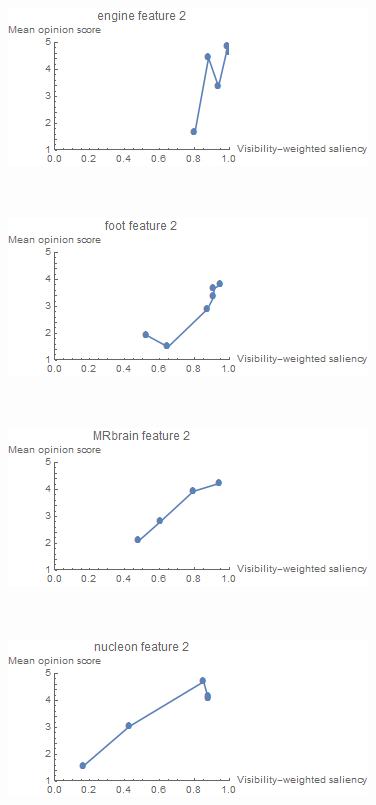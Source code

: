 \begin{figure}
	\centering
	\begin{minipage}{.24\textwidth}
		\includegraphics[width=1\linewidth]{images/mos_vs_metric_engine_feature_2}
		\subcaption{}
	\end{minipage}~
	\begin{minipage}{.24\textwidth}
		\includegraphics[width=1\linewidth]{images/mos_vs_metric_foot_feature_2}
		\subcaption{}
	\end{minipage}~
	\begin{minipage}{.24\textwidth}
		\includegraphics[width=1\linewidth]{images/mos_vs_metric_MRbrain_feature_2}
		\subcaption{}
	\end{minipage}~
	\begin{minipage}{.24\textwidth}
		\includegraphics[width=1\linewidth]{images/mos_vs_metric_nucleon_feature_2}
		\subcaption{}
	\end{minipage}


\end{figure}
